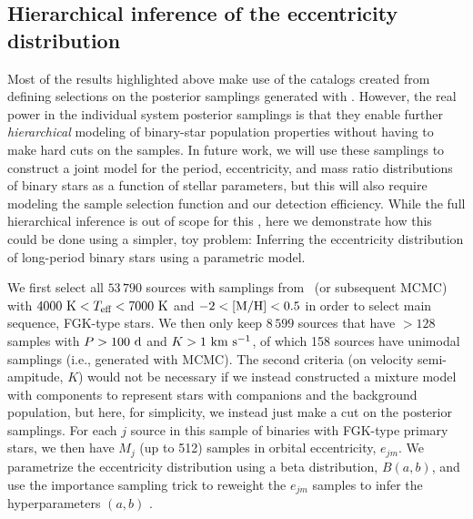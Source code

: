 \documentclass[modern]{aastex63}
\begin{document}
\subsection{Hierarchical inference of the eccentricity distribution}
\label{sec:hierarch-ecc}

Most of the results highlighted above make use of the catalogs created from
defining selections on the posterior samplings generated with \thejoker.
However, the real power in the individual system posterior samplings is that
they enable further \emph{hierarchical} modeling of binary-star population
properties without having to make hard cuts on the samples.
In future work, we will use these samplings to construct a joint model for the
period, eccentricity, and mass ratio distributions of binary stars as a function
of stellar parameters, but this will also require modeling the sample selection
function and our detection efficiency.
While the full hierarchical inference is out of scope for this \documentname,
here we demonstrate how this could be done using a simpler, toy problem:
Inferring the eccentricity distribution of long-period binary stars using a
parametric model.

We first select all $53\,790$ sources with samplings from \thejoker\ (or
subsequent MCMC) with $4000~\textrm{K} < T_{\textrm{eff}} < 7000~\textrm{K}$ and $-2 < {[{\rm M}/{\rm H}]}
< 0.5$ in order to select main sequence, FGK-type stars.
We then only keep $8\,599$ sources that have $>128$ samples with $P > 100~\mathrm{d}$
and $K > 1~\mathrm{km}~\mathrm{s}^{-1}$, of which 158 sources have unimodal samplings (i.e., generated
with MCMC).
The second criteria (on velocity semi-ampitude, $K$) would not be necessary if
we instead constructed a mixture model with components to represent stars with
companions and the background population, but here, for simplicity, we instead
just make a cut on the posterior samplings.
For each $j$ source in this sample of binaries with FGK-type primary stars, we
then have $M_j$ (up to 512) samples in orbital eccentricity, $e_{jm}$.
We parametrize the eccentricity distribution using a beta distribution,
$B(a,b)$, and use the importance sampling trick to reweight the $e_{jm}$ samples
to infer the hyperparameters $(a, b)$ \citep{Hogg:2010}.
\end{document}
